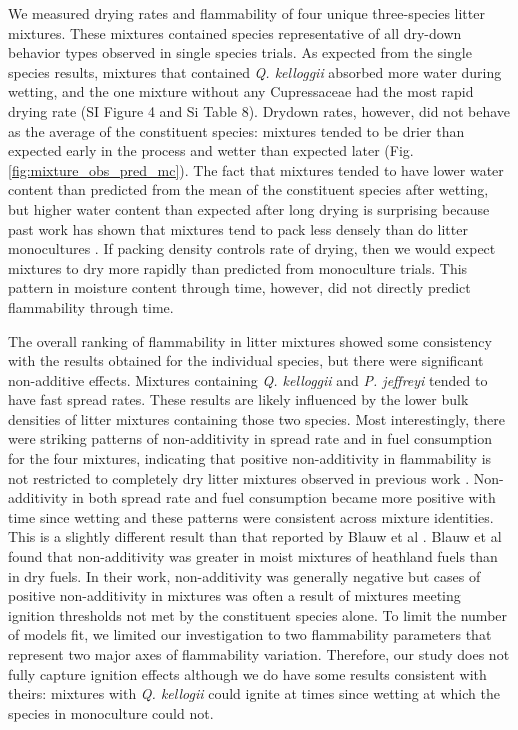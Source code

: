 \documentclass[letterpaper,12pt]{article}
\begin{document}
We measured drying rates and flammability of four unique three-species litter
mixtures. These mixtures contained species representative of all dry-down
behavior types observed in single species trials. As expected from the single
species results, mixtures that contained \emph{Q. kelloggii} absorbed more
water during wetting, and the one mixture without any Cupressaceae had the most
rapid drying rate (SI Figure 4 and Si Table 8). Drydown rates, however, did not
behave as the average of the constituent species: mixtures tended to be drier
than expected early in the process and wetter than expected later (Fig.
\ref{fig:mixture_obs_pred_mc}). The fact that mixtures tended to have lower
water content than predicted from the mean of the constituent species after
wetting, but higher water content than expected after long drying is surprising
because past work has shown that mixtures tend to pack less densely than do
litter monocultures \citep[][, Table 2]{Magalhaes+Schwilk-2012}. If packing
density controls rate of drying, then we would expect mixtures to dry more
rapidly than predicted from monoculture trials. This pattern in moisture
content through time, however, did not directly predict flammability through
time.


The overall ranking of flammability in litter mixtures showed some consistency
with the results obtained for the individual species, but there were
significant non-additive effects. Mixtures containing \emph{Q. kelloggii} and
\emph{P. jeffreyi} tended to have fast spread rates. These results are likely
influenced by the lower bulk densities of litter mixtures containing those two
species. Most interestingly, there were striking patterns of non-additivity in
spread rate and in fuel consumption for the four mixtures, indicating that
positive non-additivity in flammability is not restricted to completely dry
litter mixtures observed in previous work \citep{Magalhaes+Schwilk-2012,
  VanAltena+Logtestjin+etal-2012}. Non-additivity in both spread rate and fuel
consumption became more positive with time since wetting and these patterns
were consistent across mixture identities. This is a slightly different result
than that reported by Blauw et al \citeyear{Blauw+Wensink+etal-2015}. Blauw et
al found that non-additivity was greater in moist mixtures of heathland fuels
than in dry fuels. In their work, non-additivity was generally negative but
cases of positive non-additivity in mixtures was often a result of mixtures
meeting ignition thresholds not met by the constituent species alone. To limit
the number of models fit, we limited our investigation to two flammability
parameters that represent two major axes of flammability variation. Therefore,
our study does not fully capture ignition effects although we do have some
results consistent with theirs: mixtures with \emph{Q. kellogii} could ignite
at times since wetting at which the species in monoculture could not.
\end{document}

